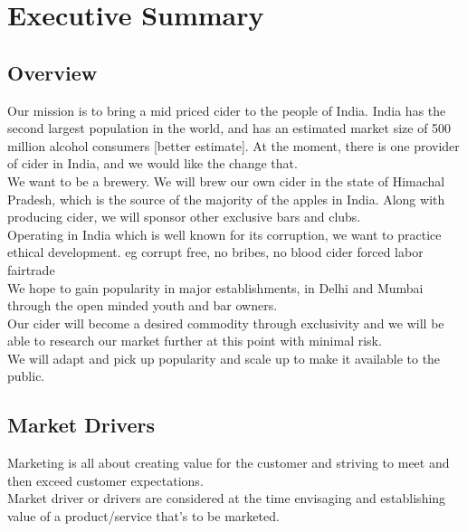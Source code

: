 \documentclass[11pt]{article}
\begin{document}
\section{Executive Summary}
  \subsection{Overview}

Our mission is to bring a mid priced cider to the people of India. India has the second largest population in the world, and has an estimated market size of 500 million alcohol consumers [better estimate]. At the moment, there is one provider of cider in India, and we would like the change that. \\

\noindent We want to be a brewery. We will brew our own cider in the state of Himachal Pradesh, which is the source of the majority of the apples in India. Along with producing cider, we will sponsor other exclusive bars and clubs. \\

\noindent Operating in India which is well known for its corruption, we want to practice ethical development. eg corrupt free, no bribes, no blood cider forced labor fairtrade \\

\noindent We hope to gain popularity in major establishments, in Delhi and Mumbai through the open minded youth and bar owners. \\

\noindent Our cider will become a desired commodity through exclusivity and we will be able to research our market further at this point with minimal risk. \\

\noindent We will adapt and pick up popularity and scale up to make it available to the public.

  \subsection{Market Drivers}
Marketing is all about creating value for the customer and striving to meet and then exceed customer expectations.\\

\noindent Market driver or drivers are considered at the time envisaging and establishing value of a product/service that's to be marketed. \\
\end{document}
